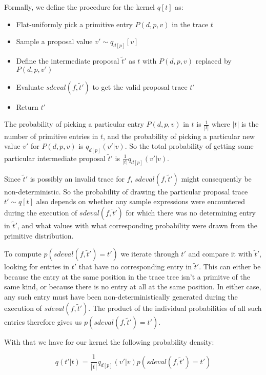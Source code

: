 Formally, we define the procedure for the kernel $q[t]$ as:

\begin{minipage}{\linewidth}
\begin{itemize}
\item Flat-uniformly pick a primitive entry $P(d,p,v)$ in the trace $t$
\item Sample a proposal value $v' \sim q_{d[p]}[v]$
\item Define the intermediate proposal $\tilde{t}'$ as $t$ with $P(d,p,v)$ replaced by $P(d,p,v')$
\item Evaluate $sdeval(f,\tilde{t}')$ to get the valid proposal trace $t'$
\item Return $t'$
\end{itemize}
\end{minipage}

The probability of picking a particular entry $P(d,p,v)$ in $t$ is $\frac{1}{|t|}$ where $|t|$ is the number of primitive entries in $t$, and the probability of picking a particular new value $v'$ for $P(d,p,v)$ is $q_{d[p]}(v' | v)$. So the total probability of getting some particular intermediate proposal $\tilde{t}'$ is $\frac{1}{|t|} q_{d[p]}(v' | v)$.

Since $\tilde{t}'$ is possibly an invalid trace for $f$, $sdeval(f,\tilde{t}')$ might consequently be non-deterministic. So the probability of drawing the particular proposal trace $t' \sim q[t]$ also depends on whether any sample expressions were encountered during the execution of $sdeval(f, \tilde{t}')$ for which there was no determining entry in $\tilde{t}'$, and what values with what corresponding probability were drawn from the primitive distribution.

To compute $p(sdeval(f,\tilde{t}') = t')$ we iterate through $t'$ and compare it with $\tilde{t}'$, looking for entries in $t'$ that have no corresponding entry in $\tilde{t}'$. This can either be because the entry at the same position in the trace tree isn't a primitve of the same kind, or because there is no entry at all at the same position. In either case, any such entry must have been non-deterministically generated during the execution of $sdeval(f,\tilde{t}')$. The product of the individual probabilities of all such entries therefore gives us $p(sdeval(f,\tilde{t}') = t')$.

With that we have for our kernel the following probability density:

\begin{equation*}
     q(t' | t) = \frac{1}{|t|} q_{d[p]}(v' | v) p(sdeval(f,\tilde{t}') = t')
\end{equation*}

